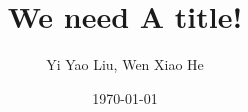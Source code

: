 \documentclass[journal]{IEEEtran}
\begin{document}
 
    \title{We need A title!}
    \author{Yi Yao Liu, Wen Xiao He}
    \date{\today}
    \maketitle
    
    \printbibliography
\end{document}
